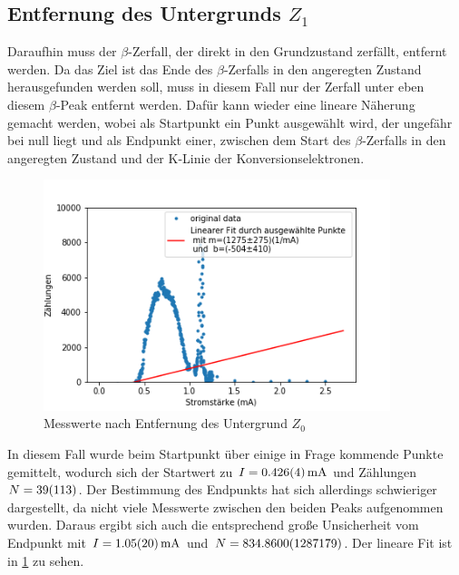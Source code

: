 \subsection{Entfernung des Untergrunds $Z_{1}$}
Daraufhin muss der $\beta$-Zerfall, der direkt in den Grundzustand zerfällt, entfernt werden. Da das Ziel ist das Ende des $\beta$-Zerfalls in den angeregten Zustand herausgefunden werden soll, muss in diesem Fall nur der Zerfall unter eben diesem $\beta$-Peak entfernt werden. Dafür kann wieder eine lineare Näherung gemacht werden, wobei als Startpunkt ein Punkt ausgewählt wird, der ungefähr bei null liegt und als Endpunkt einer, zwischen dem Start des $\beta$-Zerfalls in den angeregten Zustand und der K-Linie der Konversionselektronen. 

\begin{figure}[h]
	\centering
	\includegraphics[width=0.9\textwidth]{../Messdaten/Z1.png}
	\caption{Messwerte nach Entfernung des Untergrund $Z_{0}$}
	\label{z1}
\end{figure}


In diesem Fall wurde beim Startpunkt über einige in Frage kommende Punkte gemittelt, wodurch sich der Startwert zu $I = \SI{0,426 \pm 0,004}{mA}$ und Zählungen $N = \SI{39 \pm 113}{}$. Der Bestimmung des Endpunkts hat sich allerdings schwieriger dargestellt, da nicht viele Messwerte zwischen den beiden Peaks aufgenommen wurden. Daraus ergibt sich auch die entsprechend große Unsicherheit vom Endpunkt mit $I = \SI{1,05 \pm 0,20}{mA}$ und $N = \SI{834,86 \pm 128,7179}{}$. Der lineare Fit ist in \cref{z1} zu sehen.

